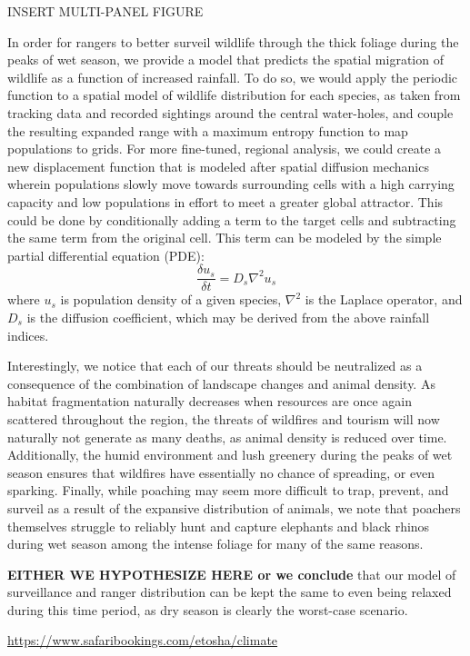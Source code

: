INSERT MULTI-PANEL FIGURE

In order for rangers to better surveil wildlife through the thick foliage during the peaks of wet season, we  provide a model that predicts the spatial migration of wildlife as a function of increased rainfall. To do so, we would apply the periodic function to a spatial model of wildlife distribution for each species, as taken from tracking data and recorded sightings around the central water-holes, and couple the resulting expanded range with a maximum entropy function to map populations to grids. For more fine-tuned, regional analysis, we could create a new displacement function that is modeled after spatial diffusion mechanics wherein populations slowly move towards surrounding cells with a high carrying capacity and low populations in effort to meet a greater global attractor. This could be done by conditionally adding a term to the target cells and subtracting the same term from the original cell. This term can be modeled by the simple partial differential equation (PDE): $$\frac{\delta u_s}{\delta t} = D_s\nabla^2u_s$$ where $u_s$ is population density of a given species, $\nabla^2$ is the Laplace operator, and $D_s$ is the diffusion coefficient, which may be derived from the above rainfall indices. 



Interestingly, we notice that each of our threats should be neutralized as a consequence of the combination of landscape changes and animal density. As habitat fragmentation naturally decreases when resources are once again scattered throughout the region, the threats of wildfires and tourism will now naturally not generate as many deaths, as animal density is reduced over time. Additionally, the humid environment and lush greenery during the peaks of wet season ensures that wildfires have essentially no chance of spreading, or even sparking. Finally, while poaching may seem more difficult to trap, prevent, and surveil as a result of the expansive distribution of animals, we note that poachers themselves struggle to reliably hunt and capture elephants and black rhinos during wet season among the intense foliage for many of the same reasons. 

\textbf{EITHER WE HYPOTHESIZE HERE or we conclude} that our model of surveillance and ranger distribution can be kept the same to even being relaxed during this time period, as dry season is clearly the worst-case scenario. 

\url{https://www.safaribookings.com/etosha/climate}
